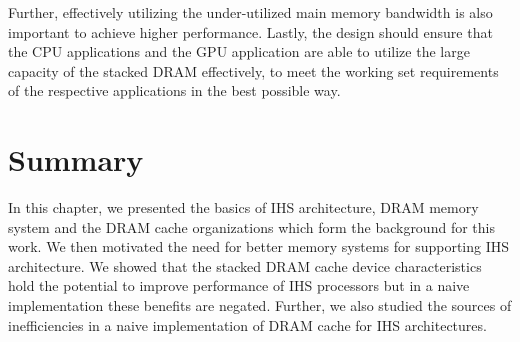 Further, effectively utilizing the under-utilized main memory bandwidth \cite{micro-refresh, mainak-hpca, bear}
is also important to achieve higher performance.  Lastly, the design should ensure that the CPU applications and the 
GPU application are able to utilize the large capacity of the stacked DRAM effectively, to meet the working set 
requirements of the respective applications in the best possible way.

\section{Summary}
In this chapter, we presented the basics of IHS architecture, DRAM memory system and the DRAM cache organizations which form the background for this work. We then motivated the need for better memory systems for supporting IHS architecture. We showed that the stacked DRAM cache device characteristics hold the potential to improve performance of IHS processors but in a naive implementation these benefits are negated. Further, we also studied the sources of inefficiencies in a naive implementation of DRAM cache for IHS architectures.
